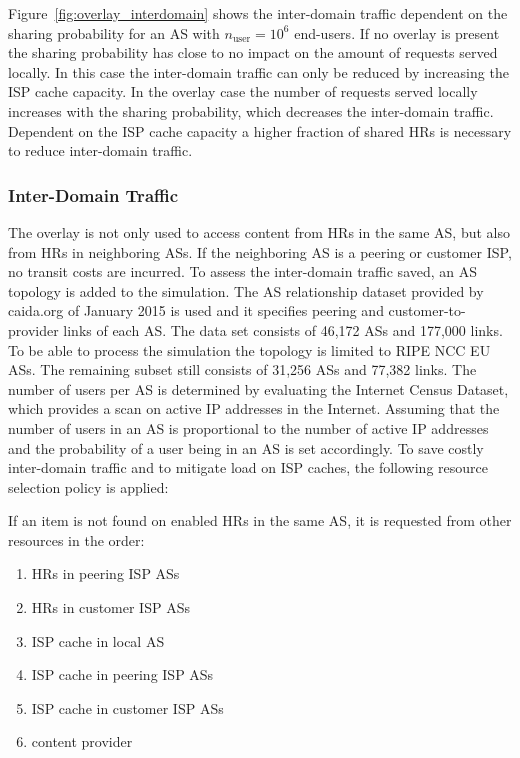 
Figure~\ref{fig:overlay_interdomain} shows the inter-domain traffic dependent on the sharing probability for an AS with $n_\text{user}=10^6$ end-users. If no overlay is present the sharing probability has close to no impact on the amount of requests served locally. In this case the inter-domain traffic can only be reduced by increasing the ISP cache capacity. In the overlay case the number of requests served locally increases with the sharing probability, which decreases the inter-domain traffic. Dependent on the ISP cache capacity a higher fraction of shared HRs is necessary to reduce inter-domain traffic.

\subsubsection{Inter-Domain Traffic}

The overlay is not only used to access content from HRs in the same AS, but also from HRs in neighboring ASs. If the neighboring AS is a peering or customer ISP, no transit costs are incurred.
To assess the inter-domain traffic saved, an AS topology is added to the simulation. The AS relationship dataset provided by caida.org\cite{caida2015} of January 2015 is used and it specifies peering and customer-to-provider links of each AS. The data set consists of 46,172 ASs and 177,000 links.
To be able to process the simulation the topology is limited to RIPE NCC EU ASs. The remaining subset still consists of 31,256 ASs and 77,382 links.
The number of users per AS is determined by evaluating the Internet Census Dataset\cite{carna2013}, which provides a scan on active IP addresses in the Internet. Assuming that the number of users in an AS is proportional to the number of active IP addresses and the probability of a user being in an AS is set accordingly.
To save costly inter-domain traffic and to mitigate load on ISP caches, the following resource selection policy is applied:

If an item is not found on enabled HRs in the same AS, it is requested from other resources in the order:
\begin{enumerate}
	\itemsep0em
	\item HRs in peering ISP ASs
	\item HRs in customer ISP ASs
	\item ISP cache in local AS
	\item ISP cache in peering ISP ASs
	\item ISP cache in customer ISP ASs
	\item content provider
\end{enumerate}

